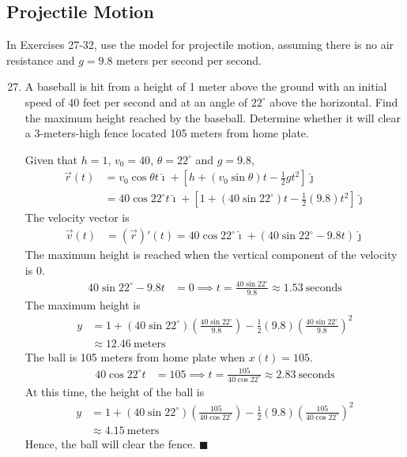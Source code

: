\subsection*{Projectile Motion}
In Exercises 27-32, use the model for projectile motion, assuming there is no
air resistance and $g=9.8$ meters per second per second.
\begin{enumerate}
    \setcounter{enumi}{26}
    \item  A baseball is hit from a height of 1 meter above the ground with an initial
          speed of 40 feet per second and at an angle of $22^{\circ}$ above the
          horizontal. Find the maximum height reached by the baseball. Determine whether
          it will clear a 3-meters-high fence located 105 meters from home plate.

          \sol{}  Given that $h = 1$, $v_0 = 40$, $\theta = 22^{\circ}$ and $g = 9.8$,
          \begin{align*}
              \vec{r}(t) & = v_0\cos\theta t\hat{\imath} + \left[h + (v_0\sin\theta) t - \frac{1}{2}gt^2\right]\hat{\jmath}               \\
                         & = 40\cos{22^{\circ}} t\hat{\imath} + \left[1 + (40\sin{22^{\circ}}) t - \frac{1}{2}(9.8)t^2\right]\hat{\jmath}
          \end{align*}
          The velocity vector is
          \begin{align*}
              \vec{v}(t) & = (\vec{r})'(t) = 40\cos{22^{\circ}}\hat{\imath} + (40\sin{22^{\circ}} - 9.8t)\hat{\jmath}
          \end{align*}
          The maximum height is reached when the vertical component of the velocity is $0$.
          \begin{align*}
              40\sin{22^{\circ}} - 9.8t & = 0 \implies t = \frac{40\sin{22^{\circ}}}{9.8} \approx 1.53\ \text{seconds}
          \end{align*}
          The maximum height is
          \begin{align*}
              y & = 1 + (40\sin{22^{\circ}})\left(\frac{40\sin{22^{\circ}}}{9.8}\right) - \frac{1}{2}(9.8)\left(\frac{40\sin{22^{\circ}}}{9.8}\right)^2 \\
                & \approx 12.46\ \text{meters}
          \end{align*}
          The ball is 105 meters from home plate when $x(t) = 105$.
          \begin{align*}
              40\cos{22^{\circ}} t & = 105 \implies t = \frac{105}{40\cos{22^{\circ}}}  \approx 2.83\ \text{seconds}
          \end{align*}
          At this time, the height of the ball is
          \begin{align*}
              y & = 1 + (40\sin{22^{\circ}})\left(\frac{105}{40\cos{22^{\circ}}}\right) - \frac{1}{2}(9.8)\left(\frac{105}{40\cos{22^{\circ}}}\right)^2 \\
                & \approx 4.15\ \text{meters}
          \end{align*}
          Hence, the ball will clear the fence. \hfill$\blacksquare$


\end{enumerate}
